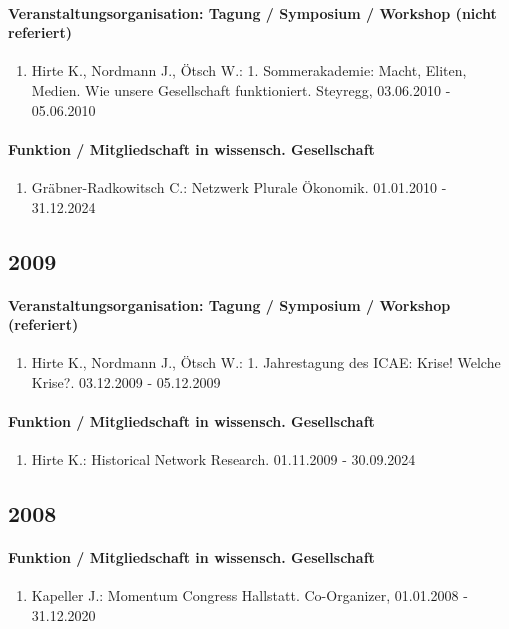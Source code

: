 \paragraph{Veranstaltungsorganisation: Tagung / Symposium / Workshop (nicht referiert)}
\begin{enumerate}[leftmargin=*, labelsep=0.5cm]
\item Hirte K., Nordmann J., Ötsch W.: 1. Sommerakademie: Macht, Eliten, Medien. Wie unsere Gesellschaft funktioniert. Steyregg, 03.06.2010 - 05.06.2010
\end{enumerate}
\paragraph{Funktion / Mitgliedschaft in wissensch. Gesellschaft}
\begin{enumerate}[leftmargin=*, labelsep=0.5cm]
\item Gräbner-Radkowitsch C.: Netzwerk Plurale Ökonomik. 01.01.2010 - 31.12.2024
\end{enumerate}\subsection*{2009}\paragraph{Veranstaltungsorganisation: Tagung / Symposium / Workshop (referiert)}
\begin{enumerate}[leftmargin=*, labelsep=0.5cm]
\item Hirte K., Nordmann J., Ötsch W.: 1. Jahrestagung des ICAE: Krise! Welche Krise?. 03.12.2009 - 05.12.2009
\end{enumerate}
\paragraph{Funktion / Mitgliedschaft in wissensch. Gesellschaft}
\begin{enumerate}[leftmargin=*, labelsep=0.5cm]
\item Hirte K.: Historical Network Research. 01.11.2009 - 30.09.2024
\end{enumerate}\subsection*{2008}\paragraph{Funktion / Mitgliedschaft in wissensch. Gesellschaft}
\begin{enumerate}[leftmargin=*, labelsep=0.5cm]
\item Kapeller J.: Momentum Congress Hallstatt. Co-Organizer, 01.01.2008 - 31.12.2020
\end{enumerate}